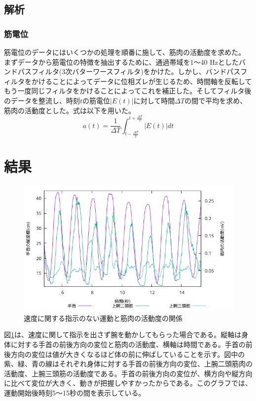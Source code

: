 \documentclass{jsarticle}
\begin{document}
\subsection{解析}
\subsubsection{筋電位}
筋電位のデータにはいくつかの処理を順番に施して、筋肉の活動度を求めた。
  まずデータから筋電位の特徴を抽出するために、通過帯域を1〜40 Hzとしたバンドパスフィルタ(3次バターワースフィルタ)をかけた。しかし、バンドパスフィルタをかけることによってデータに位相ズレが生じるため、時間軸を反転してもう一度同じフィルタをかけることによってこれを補正した。そしてフィルタ後のデータを整流し、時刻$t$の筋電位$|E(t)|$に対して時間$\Delta T$の間で平均を求め、筋肉の活動度とした。式は以下を用いた。
  \begin{equation}
    a(t) = \frac{1}{\Delta T} \int_{t-\frac{\Delta T}{2}}^{t+\frac{\Delta T}{2}} |E(t)| dt
  \end{equation}

\section{結果}
\begin{figure}[b]
  \begin{center}
    \includegraphics[width=15cm]{images/s1proto.png}
  \end{center}
  \caption{速度に関する指示のない運動と筋肉の活動度の関係}
  \label{fig:slow}
\end{figure}
図\ref{fig:slow}は、速度に関して指示を出さず腕を動かしてもらった場合である。縦軸は身体に対する手首の前後方向の変位と筋肉の活動度、横軸は時間である。手首の前後方向の変位は値が大きくなるほど体の前に伸ばしていることを示す。図中の紫、緑、青の線はそれぞれ身体に対する手首の前後方向の変位、上腕二頭筋肉の活動度、上腕三頭筋の活動度である。手首の前後方向の変位が、横方向や縦方向に比べて変位が大きく、動きが把握しやすかったからである。このグラフでは、運動開始後時刻5〜15秒の間を表示している。
\end{document}
